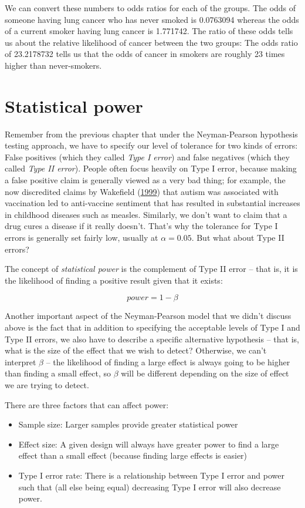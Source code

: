 \documentclass[12pt,]{book}
\providecommand{\tightlist}{%
  \setlength{\itemsep}{0pt}\setlength{\parskip}{0pt}}
\begin{document}
We can convert these numbers to odds ratios for each of the groups. The odds of someone having lung cancer who has never smoked is 0.0763094 whereas the odds of a current smoker having lung cancer is 1.771742. The ratio of these odds tells us about the relative likelihood of cancer between the two groups: The odds ratio of 23.2178732 tells us that the odds of cancer in smokers are roughly 23 times higher than never-smokers.

\hypertarget{statistical-power}{%
\section{Statistical power}\label{statistical-power}}

Remember from the previous chapter that under the Neyman-Pearson hypothesis testing approach, we have to specify our level of tolerance for two kinds of errors: False positives (which they called \emph{Type I error}) and false negatives (which they called \emph{Type II error}). People often focus heavily on Type I error, because making a false positive claim is generally viewed as a very bad thing; for example, the now discredited claims by Wakefield (\protect\hyperlink{ref-wake:1999}{1999}) that autism was associated with vaccination led to anti-vaccine sentiment that has resulted in substantial increases in childhood diseases such as measles. Similarly, we don't want to claim that a drug cures a disease if it really doesn't. That's why the tolerance for Type I errors is generally set fairly low, usually at \(\alpha = 0.05\). But what about Type II errors?

The concept of \emph{statistical power} is the complement of Type II error -- that is, it is the likelihood of finding a positive result given that it exists:

\[ 
power = 1 - \beta
\]

Another important aspect of the Neyman-Pearson model that we didn't discuss above is the fact that in addition to specifying the acceptable levels of Type I and Type II errors, we also have to describe a specific alternative hypothesis -- that is, what is the size of the effect that we wish to detect? Otherwise, we can't interpret \(\beta\) -- the likelihood of finding a large effect is always going to be higher than finding a small effect, so \(\beta\) will be different depending on the size of effect we are trying to detect.

There are three factors that can affect power:

\begin{itemize}
\tightlist
\item
  Sample size: Larger samples provide greater statistical power
\item
  Effect size: A given design will always have greater power to find a large effect than a small effect (because finding large effects is easier)
\item
  Type I error rate: There is a relationship between Type I error and power such that (all else being equal) decreasing Type I error will also decrease power.
\end{itemize}
\end{document}
